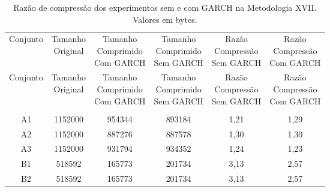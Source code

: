 \begin{center}
\begin{longtable}{cccccc}
\toprule
\rowcolor{white}
\caption[Metodologia XVII: Razão de compressão]{Razão de compressão dos
experimentos sem e com GARCH na Metodologia XVII.
Valores em bytes.} \label{Tab:razaocompressaoMet} \\
\midrule
Conjunto & \specialcell{Tamanho \\Original} & \specialcell{Tamanho
\\Comprimido\\Com GARCH} & \specialcell{Tamanho
\\Comprimido\\Sem GARCH} & \specialcell{Razão \\Compressão
\\Sem GARCH} & \specialcell{Razão \\Compressão
\\Com GARCH} \\
\midrule
\endfirsthead
\midrule
\rowcolor{white}
Conjunto & \specialcell{Tamanho \\Original} & \specialcell{Tamanho
\\Comprimido\\Com GARCH} & \specialcell{Tamanho
\\Comprimido\\Sem GARCH} & \specialcell{Razão \\Compressão
\\Sem GARCH} & \specialcell{Razão \\Compressão
\\Com GARCH} \\
\toprule
\endhead
\midrule \\ %
\endfoot
\bottomrule
\endlastfoot
    A1    & 1152000 & 954344 & 893184 & 1,21  & 1,29 \\
    A2    & 1152000 & 887276 & 887578 & 1,30  & 1,30 \\
    A3    & 1152000 & 931794 & 934352 & 1,24  & 1,23 \\
    B1    & 518592 & 165773 & 201734 & 3,13  & 2,57 \\
    B2    & 518592 & 165773 & 201734 & 3,13  & 2,57 \\

\end{longtable}
\end{center}
